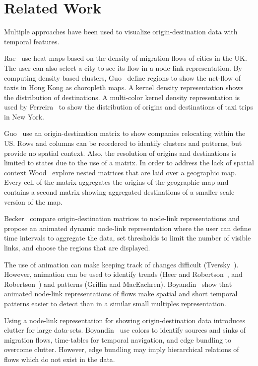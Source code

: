 \section{Related Work}
\label{sec:rel}
Multiple approaches have been used
to visualize origin-destination data with temporal features.

Rae~\cite{Rae2009} use heat-maps based on
the density of migration flows of cities in the UK.
The user can also select a city to see its flow
in a node-link representation.
By computing density based clusters,
Guo~\etal\cite{Guo2012} define regions
to show the net-flow of taxis in Hong Kong
as choropleth maps.
A kernel density representation shows
the distribution of destinations.
A multi-color kernel density representation is
used by Ferreira~\etal\cite{Ferreira2013}
to show the distribution of
origins and destinations of taxi trips in New York.

Guo~\etal\cite{Guo2006} use an origin-destination matrix
to show companies relocating within the US.
Rows and columns can be reordered to identify clusters
and patterns, but provide no spatial context.
Also, the resolution of origins and destinations is limited
to states due to the use of a matrix.
In order to address the lack of spatial context
Wood~\etal\cite{Wood2002} explore nested matrices
that are laid over a geographic map.
Every cell of the matrix aggregates the origins
of the geographic map and contains
a second matrix showing aggregated destinations of
a smaller scale version of the map.

Becker~\etal\cite{Becker1995} compare
origin-destination matrices to node-link representations
and propose an animated dynamic node-link representation
where the user can define time intervals to aggregate the data,
set thresholds to limit the number of visible links,
and choose the regions that are displayed.

The use of animation can make keeping track of changes
difficult (Tversky~\etal\cite{Tversky2002}).
However, animation can be used to
identify trends (Heer and Robertson~\cite{Heer2007},
and Robertson~\etal\cite{Robertson}) and
patterns (Griffin and MacEachren\cite{Griffin2006}).
Boyandin~\etal\cite{Boyandin2012} show that animated
node-link representations of flows make spatial and
short temporal patterns easier to detect than in
a similar small multiples representation.

Using a node-link representation for showing origin-destination
data introduces clutter for large data-sets.
Boyandin~\etal\cite{Boyandin2008} use colors to identify
sources and sinks of migration flows,
time-tables for temporal navigation, and
edge bundling to overcome clutter.
However, edge bundling may imply hierarchical
relations of flows which do not exist in the data.


